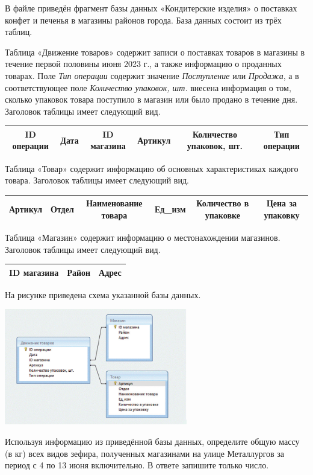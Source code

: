 \documentclass[14pt,a4paper]{article}
\begin{document}
В файле приведён фрагмент базы данных «Кондитерские изделия»
о поставках конфет и печенья в магазины районов города. База данных
состоит из трёх таблиц.

Таблица «Движение товаров» содержит записи о поставках товаров в
магазины в течение первой половины июня 2023 г., а также информацию о
проданных товарах. Поле \textit{Тип операции} содержит значение
\textit{Поступление} или \textit{Продажа}, а в соответствующее поле
\textit{Количество упаковок, шт.} внесена информация о том, сколько
упаковок товара поступило в магазин или было продано в течение дня.
Заголовок таблицы имеет следующий вид.

\begin{center}
    \begin{tabular}{|c|c|c|c|c|c|}
        \hline
        ID операции & Дата & ID магазина & Артикул & Количество упаковок, шт. & Тип операции \\
        \hline
    \end{tabular}
\end{center}

Таблица «Товар» содержит информацию об основных характеристиках
каждого товара. Заголовок таблицы имеет следующий вид.

\begin{center}
    \begin{tabular}{|c|c|c|c|c|c|}
        \hline
        Артикул & Отдел & Наименование товара & Ед\_изм & Количество в упаковке & Цена за упаковку \\
        \hline
    \end{tabular}
\end{center}

Таблица «Магазин» содержит информацию о местонахождении магазинов.
Заголовок таблицы имеет следующий вид.

\begin{center}
    \begin{tabular}{|c|c|c|}
        \hline
        ID магазина & Район & Адрес \\
        \hline
    \end{tabular}
\end{center}

На рисунке приведена схема указанной базы данных.

\begin{center}
    \includegraphics[width=0.6\textwidth]{table.png}
\end{center}

Используя информацию из приведённой базы данных, определите общую
массу (в кг) всех видов зефира, полученных магазинами на улице
Металлургов за период с 4 по 13 июня включительно.
В ответе запишите только число.
\end{document}
